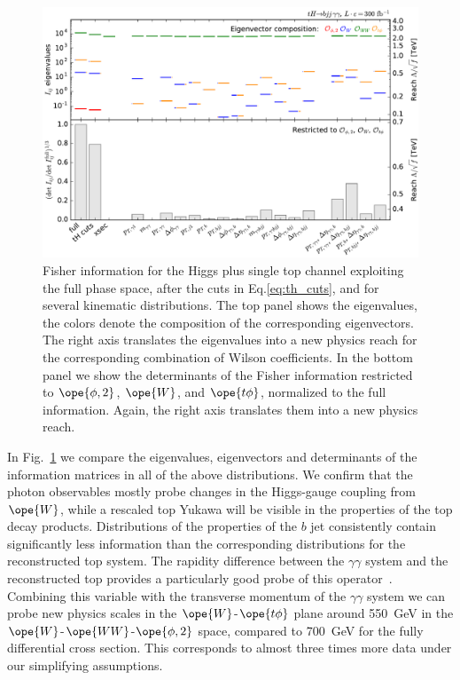 \begin{figure}
  \includegraphics[height=0.6 \textwidth]{fig/information/th_histos_comparison}
  \caption{Fisher information for the Higgs plus single top channel
    exploiting the full phase space, after the cuts in
    Eq.\;\eqref{eq:th_cuts}, and for several kinematic distributions.
    The top panel shows the eigenvalues, the colors denote the
    composition of the corresponding eigenvectors. The right axis
    translates the eigenvalues into a new physics reach for the
    corresponding combination of Wilson coefficients.  In the bottom
    panel we show the determinants of the Fisher information
    restricted to $\ope{\phi,2}$, $\ope{W}$, and $\ope{t\phi}$,
    normalized to the full information. Again, the right axis
    translates them into a new physics reach.}
\label{fig:information_th_histograms_comparison}
\end{figure}

In Fig.~\ref{fig:information_th_histograms_comparison} we compare the eigenvalues,
eigenvectors and determinants of the information matrices in all of
the above distributions. We confirm that the photon observables mostly
probe changes in the Higgs-gauge coupling from $\ope{W}$, while a
rescaled top Yukawa will be visible in the properties of the top decay
products. Distributions of the properties of the $b$ jet consistently
contain significantly less information than the corresponding
distributions for the reconstructed top system. The rapidity
difference between the $\gamma \gamma$ system and the reconstructed
top provides a particularly good probe of this
operator~\cite{top_higgs}. Combining this variable with the transverse
momentum of the $\gamma \gamma$ system we can probe new physics scales
in the $\ope{W}$-$\ope{t\phi}$ plane around 550~GeV in the
$\ope{W}$-$\ope{WW}$-$\ope{\phi,2}$ space, compared to 700~GeV for the
fully differential cross section. This corresponds to almost three
times more data under our simplifying assumptions.







